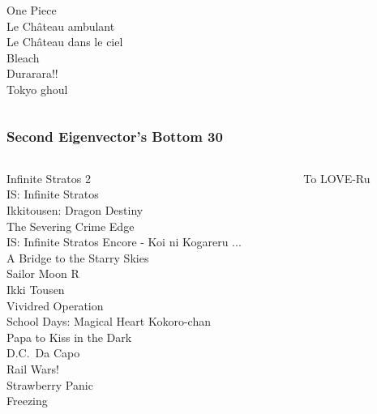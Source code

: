 \documentclass[handout]{beamer}
\begin{document}
\begin{frame}
\begin{columns}
\begin{column}{0.5\textwidth}
                                           One Piece\\
                                 Le Château ambulant\\
                             Le Château dans le ciel\\
                                              Bleach\\
                                          Durarara!!\\
                                         Tokyo ghoul\\
    \end{column}
    \end{columns}
\end{frame}

\begin{frame}
    \frametitle{Second Eigenvector's Bottom 30}
    \begin{columns}
    \begin{column}{0.5\textwidth}
                                  Infinite Stratos 2\\
                                IS: Infinite Stratos\\
                          Ikkitousen: Dragon Destiny\\
                             The Severing Crime Edge\\
   IS: Infinite Stratos Encore - Koi ni Kogareru ...\\
                        A Bridge to the Starry Skies\\
                                       Sailor Moon R\\
                                         Ikki Tousen\\
                                  Vividred Operation\\
              School Days: Magical Heart Kokoro-chan\\
                            Papa to Kiss in the Dark\\
                                       D.C.~Da Capo~\\
                                          Rail Wars!\\
                                    Strawberry Panic\\
                                            Freezing\\
    \end{column}
    \begin{column}{0.5\textwidth}
                                          To LOVE-Ru\\

\end{column}
\end{columns}
\end{frame}
\end{document}
